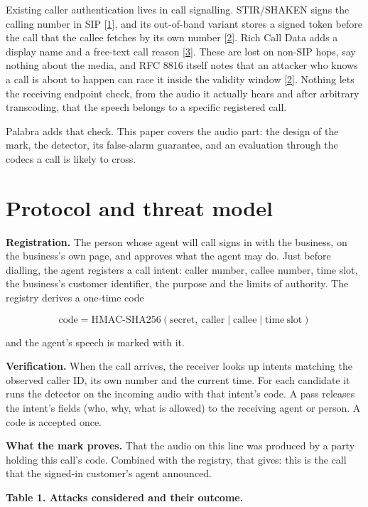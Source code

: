 \documentclass[10pt,a4paper]{article}
\begin{document}
Existing caller authentication lives in call signalling. STIR/SHAKEN signs the calling number in SIP {[}\hyperlink{ref-1}{1}{]}, and its out-of-band variant stores a signed token before the call that the callee fetches by its own number {[}\hyperlink{ref-2}{2}{]}. Rich Call Data adds a display name and a free-text call reason {[}\hyperlink{ref-3}{3}{]}. These are lost on non-SIP hops, say nothing about the media, and RFC 8816 itself notes that an attacker who knows a call is about to happen can race it inside the validity window {[}\hyperlink{ref-2}{2}{]}. Nothing lets the receiving endpoint check, from the audio it actually hears and after arbitrary transcoding, that the speech belongs to a specific registered call.

Palabra adds that check. This paper covers the audio part: the design of the mark, the detector, its false-alarm guarantee, and an evaluation through the codecs a call is likely to cross.

\section{Protocol and threat model}\label{s-2}

\textbf{Registration.} The person whose agent will call signs in with the business, on the business's own page, and approves what the agent may do. Just before dialling, the agent registers a call intent: caller number, callee number, time slot, the business's customer identifier, the purpose and the limits of authority. The registry derives a one-time code

\[\mathrm{code} = \mathrm{HMAC\mbox{-}SHA256}(\mathrm{secret},\ \mathrm{caller} \mid \mathrm{callee} \mid \mathrm{time\ slot})\]

and the agent's speech is marked with it.

\textbf{Verification.} When the call arrives, the receiver looks up intents matching the observed caller ID, its own number and the current time. For each candidate it runs the detector on the incoming audio with that intent's code. A pass releases the intent's fields (who, why, what is allowed) to the receiving agent or person. A code is accepted once.

\textbf{What the mark proves.} That the audio on this line was produced by a party holding this call's code. Combined with the registry, that gives: this is the call that the signed-in customer's agent announced.

\begin{center}\small {}\label{t-1}\textbf{Table 1. Attacks considered and their outcome.}\end{center}
\end{document}
